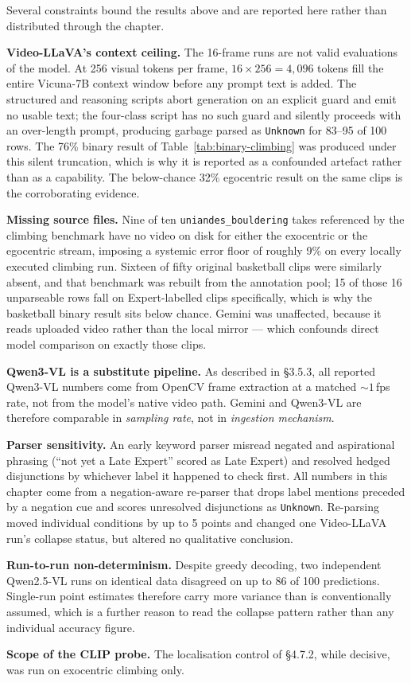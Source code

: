 \documentclass[logo,msc]{infthesis}
\newcommand{\runin}[1]{\par\medskip\noindent\textbf{#1}}
\begin{document}
Several constraints bound the results above and are reported here rather
than distributed through the chapter.

\runin{Video-LLaVA's context ceiling.} The 16-frame runs are not valid
evaluations of the model. At 256 visual tokens per frame,
$16 \times 256 = 4{,}096$ tokens fill the entire Vicuna-7B context window
before any prompt text is added. The structured and reasoning scripts abort
generation on an explicit guard and emit no usable text; the four-class
script has no such guard and silently proceeds with an over-length prompt,
producing garbage parsed as \texttt{Unknown} for 83--95 of 100 rows. The
76\% binary result of Table~\ref{tab:binary-climbing} was produced under
this silent truncation, which is why it is reported as a confounded
artefact rather than as a capability. The below-chance 32\% egocentric
result on the same clips is the corroborating evidence.

\runin{Missing source files.} Nine of ten \texttt{uniandes\_bouldering}
takes referenced by the climbing benchmark have no video on disk for either
the exocentric or the egocentric stream, imposing a systemic error floor of
roughly 9\% on every locally executed climbing run. Sixteen of fifty
original basketball clips were similarly absent, and that benchmark was
rebuilt from the annotation pool; 15 of those 16 unparseable rows fall on
Expert-labelled clips specifically, which is why the basketball binary
result sits below chance. Gemini was unaffected, because it reads uploaded
video rather than the local mirror --- which confounds direct model
comparison on exactly those clips.

\runin{Qwen3-VL is a substitute pipeline.} As described in §3.5.3, all
reported Qwen3-VL numbers come from OpenCV frame extraction at a matched
${\sim}1$\,fps rate, not from the model's native video path. Gemini and
Qwen3-VL are therefore comparable in \emph{sampling rate}, not in
\emph{ingestion mechanism}.

\runin{Parser sensitivity.} An early keyword parser misread negated and
aspirational phrasing (``not yet a Late Expert'' scored as Late Expert) and
resolved hedged disjunctions by whichever label it happened to check first.
All numbers in this chapter come from a negation-aware re-parser that drops
label mentions preceded by a negation cue and scores unresolved
disjunctions as \texttt{Unknown}. Re-parsing moved individual conditions by
up to 5 points and changed one Video-LLaVA run's collapse status, but
altered no qualitative conclusion.

\runin{Run-to-run non-determinism.} Despite greedy decoding, two
independent Qwen2.5-VL runs on identical data disagreed on up to 86 of 100
predictions. Single-run point estimates therefore carry more variance than
is conventionally assumed, which is a further reason to read the collapse
pattern rather than any individual accuracy figure.

\runin{Scope of the CLIP probe.} The localisation control of §4.7.2,
while decisive, was run on exocentric climbing only.



\end{document}

